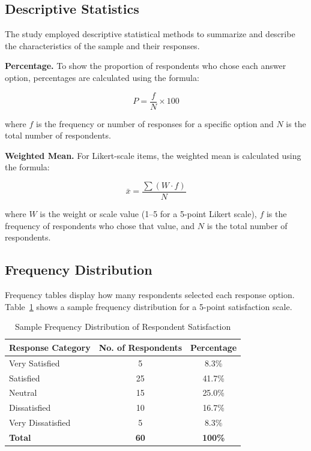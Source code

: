 \documentclass[12pt]{report}
\begin{document}
\subsection*{Descriptive Statistics}

The study employed descriptive statistical methods to summarize and describe
the characteristics of the sample and their responses.

\noindent\textbf{Percentage.} To show the proportion of respondents who chose each
answer option, percentages are calculated using the formula:

\begin{equation}
  P = \frac{f}{N} \times 100
  \label{eq:percentage}
\end{equation}

\noindent where $f$ is the frequency or number of responses for a specific
option and $N$ is the total number of respondents.

\noindent\textbf{Weighted Mean.} For Likert-scale items, the weighted mean is calculated
using the formula:

\begin{equation}
  \bar{x} = \frac{\sum (W \cdot f)}{N}
  \label{eq:weightedmean}
\end{equation}

\noindent where $W$ is the weight or scale value (1--5 for a 5-point Likert
scale), $f$ is the frequency of respondents who chose that value, and $N$ is
the total number of respondents.

\subsection*{Frequency Distribution}

Frequency tables display how many respondents selected each response option.
Table~\ref{tab:frequency} shows a sample frequency distribution for a
5-point satisfaction scale.

\begin{table}[htbp]
  \centering
  \caption{Sample Frequency Distribution of Respondent Satisfaction}
  \label{tab:frequency}
  \begin{tabular}{lcc}
    \toprule
    \textbf{Response Category} & \textbf{No. of Respondents} &
    \textbf{Percentage} \\
    \midrule
    Very Satisfied    & 5  & 8.3\%   \\
    Satisfied         & 25 & 41.7\%  \\
    Neutral           & 15 & 25.0\%  \\
    Dissatisfied      & 10 & 16.7\%  \\
    Very Dissatisfied & 5  & 8.3\%   \\
    \midrule
    \textbf{Total}    & \textbf{60} & \textbf{100\%} \\
    \bottomrule
  \end{tabular}
\end{table}
\end{document}
